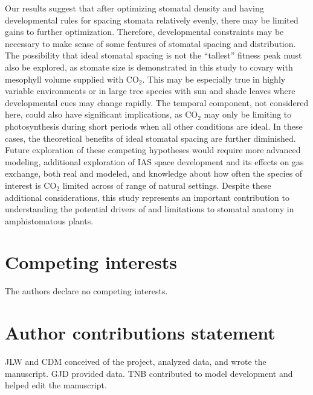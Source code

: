 \documentclass[webpdf,large,modern,unnumsec,namedate]{oup-authoring-template}
\begin{document}
Our results suggest that after optimizing stomatal density and having
developmental rules for spacing stomata relatively evenly, there may be
limited gains to further optimization. Therefore, developmental
constraints may be necessary to make sense of some features of stomatal
spacing and distribution. The possibility that ideal stomatal spacing is
not the ``tallest'' fitness peak must also be explored, as stomate size
is demonstrated in this study to covary with mesophyll volume supplied
with CO\(_2\). This may be especially true in highly variable
environments or in large tree species with sun and shade leaves where
developmental cues may change rapidly. The temporal component, not
considered here, could also have significant implications, as CO\(_2\)
may only be limiting to photosynthesis during short periods when all
other conditions are ideal. In these cases, the theoretical benefits of
ideal stomatal spacing are further diminished. Future exploration of
these competing hypotheses would require more advanced modeling,
additional exploration of IAS space development and its effects on gas
exchange, both real and modeled, and knowledge about how often the
species of interest is CO\(_2\) limited across of range of natural
settings. Despite these additional considerations, this study represents
an important contribution to understanding the potential drivers of and
limitations to stomatal anatomy in amphistomatous plants.

\section{Competing interests}

The authors declare no competing interests.

\section{Author contributions statement}

JLW and CDM conceived of the project, analyzed data, and wrote the
manuscript. GJD provided data. TNB contributed to model development and
helped edit the manuscript.


\renewcommand\refname{References}




\end{document}
